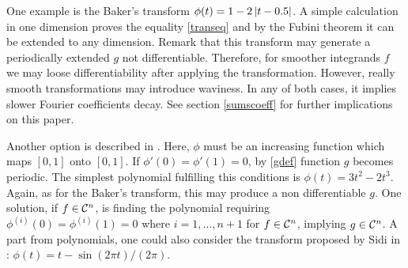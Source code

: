\documentclass[graybox,footinfo]{svmult}
\begin{document}
One example is the Baker's transform $\phi(t)=1-2\left | t-0.5 \right |$. A simple calculation in one dimension proves the equality \eqref{transeq} and by the Fubini theorem it can be extended to any dimension. Remark that this transform may generate a periodically extended $g$ not differentiable. Therefore, for smoother integrands $f$ we may loose differentiability after applying the transformation. However, really smooth transformations may introduce waviness. In any of both cases, it implies slower Fourier coefficients decay. See section \eqref{sumscoeff} for further implications on this paper.

Another option is described in \cite{SloJoe94}. Here, $\phi$ must be an increasing function which maps $[0,1]$ onto $[0,1]$. If $\phi'(0)=\phi'(1)=0$, by \eqref{gdef} function $g$ becomes periodic. The simplest polynomial fulfilling this conditions is $\phi(t)=3t^2-2t^3$. Again, as for the Baker's transform, this may produce a non differentiable $g$. One solution, if $f\in\mathcal{C}^n$, is finding the polynomial requiring $\phi^{(i)}(0)=\phi^{(i)}(1)=0$  where $i=1,\dots,n+1$ for $f\in\mathcal{C}^n$, implying $g\in\mathcal{C}^n$. A part from polynomials, one could also consider the transform proposed by Sidi in \cite{sidi1993new}: $\phi(t)=t-\sin(2\pi t)/(2\pi)$.
\end{document}

